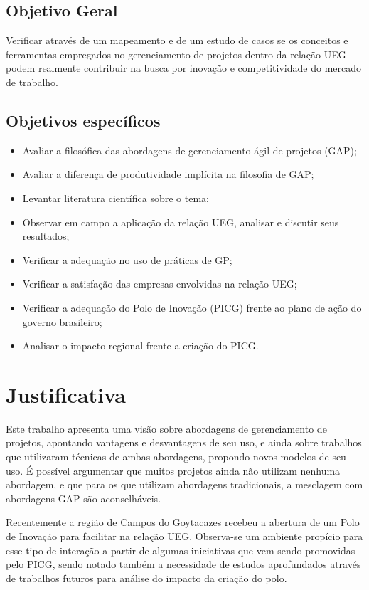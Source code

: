 \subsection{Objetivo Geral}

Verificar através de um mapeamento e de um estudo de casos se os conceitos e ferramentas empregados no gerenciamento de projetos dentro da relação UEG podem realmente contribuir na busca por inovação e competitividade do mercado de trabalho.


\subsection{Objetivos específicos}

\begin{itemize}
  \item{Avaliar a filosófica das abordagens de gerenciamento ágil de projetos (GAP);}
  \item{Avaliar a diferença de produtividade implícita na filosofia de GAP;}
  \item{Levantar literatura científica sobre o tema;}
  \item{Observar em campo a aplicação da relação UEG, analisar e discutir seus resultados;}
  \item{Verificar a adequação no uso de práticas de GP;}
  \item{Verificar a satisfação das empresas envolvidas na relação UEG;}
  \item{Verificar a adequação do Polo de Inovação (PICG) frente ao plano de ação do governo brasileiro;}
  \item{Analisar o impacto regional frente a criação do PICG.}
\end{itemize}

\section{Justificativa}

Este trabalho apresenta uma visão sobre abordagens de gerenciamento de projetos, apontando vantagens e desvantagens de seu uso, e ainda sobre trabalhos que utilizaram técnicas de ambas abordagens, propondo novos modelos de seu uso. É possível argumentar que muitos projetos ainda não utilizam nenhuma abordagem, e que para os que utilizam abordagens tradicionais, a mesclagem com abordagens GAP são aconselháveis.

Recentemente a região de Campos do Goytacazes recebeu a abertura de um Polo de Inovação para facilitar na relação UEG. Observa-se um ambiente propício para esse tipo de interação a partir de algumas iniciativas que vem sendo promovidas pelo PICG, sendo notado também a necessidade de estudos aprofundados através de trabalhos futuros para análise do impacto da criação do polo.

